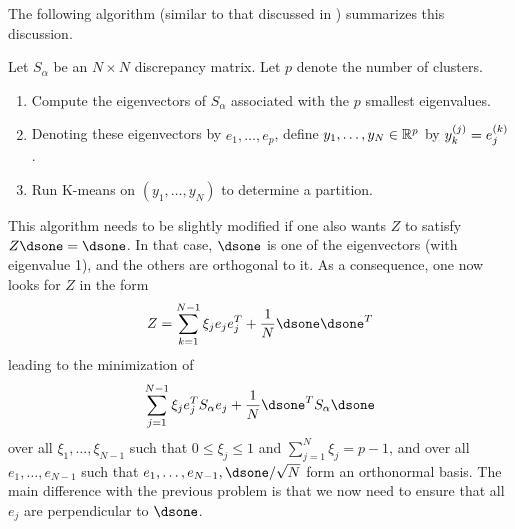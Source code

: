 The following algorithm (similar to that discussed in \citep{drineas2004clustering}) summarizes this discussion.
\begin{algorithm}
\label{alg:sc.v1}
Let $S_\alpha$ be an $N\times N$ discrepancy matrix. Let $p$ denote the number of clusters.
\begin{enumerate}
\item Compute the eigenvectors of $S_\alpha$ associated with the $p$ smallest eigenvalues.
\item Denoting these eigenvectors by $e_1, \ldots, e_p$, define $y_1, \ldots, y_N \in {\mathbb{R}}^p$ by $y_k^{(j)} = e_j^{(k)}$.
\item Run K-means on $(y_1, \ldots, y_N)$ to determine a partition.
\end{enumerate}
\end{algorithm}

This algorithm needs to be slightly modified if one also wants $Z$ to satisfy $Z\dsone = \dsone$. In that case, $\dsone$ is one of the eigenvectors (with eigenvalue 1), and the others are orthogonal to it. As a consequence, one now looks for $Z$ in the form
\[
Z = \sum_{k=1}^{N-1} \xi_j e_je_j^T + \frac1N \dsone\dsone^T
\]
leading to the minimization of
\[
\sum_{j=1}^{N-1} \xi_j e_j^T S_\alpha e_j  + \frac1N \dsone^TS_\alpha\dsone
\]
over all $\xi_1, \ldots, \xi_{N-1}$ such that $0\leq \xi_j \leq 1$ and $\sum_{j=1}^N \xi_j = p-1$, and over all $e_1, \ldots, e_{N-1}$ such that $e_1, \ldots, e_{N-1}, \dsone/\sqrt N$ form an orthonormal basis. The main difference with the previous problem is that we now need to ensure that all $e_j$ are perpendicular to $\dsone$.

